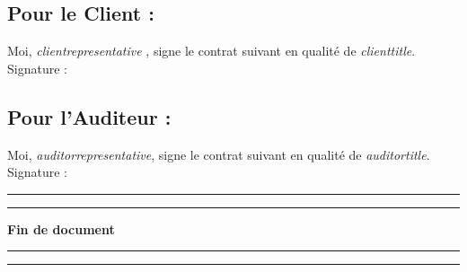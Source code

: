 \documentclass[12pt]{extarticle}
\begin{document}
\subsection{Pour le Client :}
Moi, \textit{ {{clientrepresentative}} }, signe le contrat suivant en qualité de \textit{ {{clienttitle}}}.
\vspace{3cm}
Signature :
\subsection{Pour l'Auditeur :}
Moi, \textit{ {{auditorrepresentative}}}, signe le contrat suivant en qualité de \textit{ {{auditortitle}}}.
\vspace{3cm}
Signature :
\noindent\rule{\textwidth}{0.4pt}
\vspace{1cm}
\noindent\rule{\textwidth}{0.4pt}
\begin{center}
    \Huge\textbf{Fin de document}
\end{center}
\vspace{1cm}
\noindent\rule{\textwidth}{0.4pt}
\vspace{1cm}
\noindent\rule{\textwidth}{0.4pt}
\end{document}

